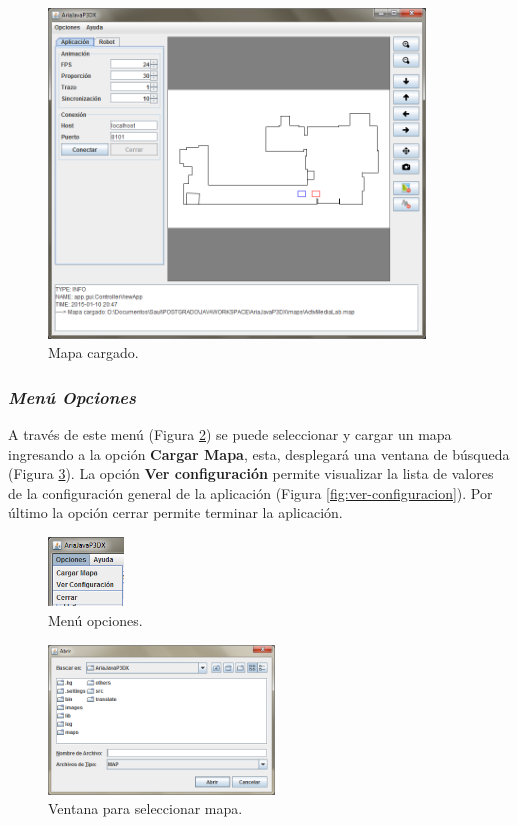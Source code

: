 \documentclass[11pt,twoside,A5]{article}
\newcommand{\reffigure}[1]{Figura \ref{#1}}
\newcommand{\refpfigure}[1]{(\reffigure{#1})}
\begin{document}
\begin{figure}[H]
\begin{center}
\includegraphics[width=10cm]{mapa-cargado.png} 
\caption{Mapa cargado.}
\label{fig:mapa-cargado}
\end{center}
\end{figure} 

\pagebreak
\subsubsection*{\textit{Menú Opciones}}

A través de este menú \refpfigure{fig:menu-opciones} se puede seleccionar y cargar un mapa ingresando 
a la opción \textbf{Cargar Mapa}, esta, desplegará una ventana de búsqueda \refpfigure{fig:cargar-mapa}.
La opción \textbf{Ver configuración} permite visualizar la lista de valores de la configuración general de la aplicación \refpfigure{fig:ver-configuracion}. Por último la opción cerrar permite terminar la aplicación.

\begin{figure}[H]
\begin{center}
\includegraphics[width=2cm]{menu-opciones2.png} 
\caption{Menú opciones.}
\label{fig:menu-opciones}
\end{center}
\end{figure} 

\begin{figure}[H]
\begin{center}
\includegraphics[width=6cm]{cargar-mapa.png} 
\caption{Ventana para seleccionar mapa.}
\label{fig:cargar-mapa}
\end{center}
\end{figure} 
\end{document}
